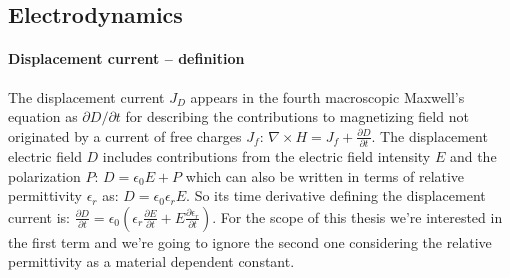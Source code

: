 	\subsection{Electrodynamics}

%

		\paragraph{Displacement current -- definition}\label{intro_displacement_current} The displacement current $J_D$ appears in the fourth macroscopic Maxwell's equation as $\partial D / \partial t$ for describing the contributions to magnetizing field not originated by a current of free charges $J_f$: $\nabla \times H = J_f + \frac{\partial D}{\partial t}$.
		The displacement electric field $D$ includes contributions from the electric field intensity $E$ and the polarization $P$: $D=\epsilon_0 E + P$ which can also be written in terms of relative permittivity $\epsilon_r$ as: $D= \epsilon_0 \epsilon_r E$.
		So its time derivative defining the displacement current is: $\frac{\partial D}{\partial t} = \epsilon_0 (\epsilon_r\frac{\partial E}{\partial t} + E\frac{\partial \epsilon_r}{\partial t})$.
		For the scope of this thesis we're interested in the first term and we're going to ignore the second one considering the relative permittivity as a material dependent constant.


